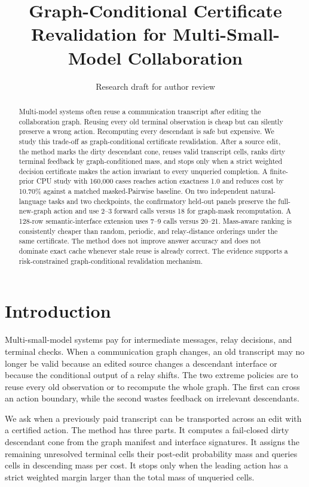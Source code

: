 \documentclass[11pt]{article}
\title{Graph-Conditional Certificate Revalidation for Multi-Small-Model Collaboration}
\author{Research draft for author review}
\begin{document}
\maketitle

\begin{abstract}
Multi-model systems often reuse a communication transcript after editing the collaboration graph. Reusing every old terminal observation is cheap but can silently preserve a wrong action. Recomputing every descendant is safe but expensive. We study this trade-off as graph-conditional certificate revalidation. After a source edit, the method marks the dirty descendant cone, reuses valid transcript cells, ranks dirty terminal feedback by graph-conditioned mass, and stops only when a strict weighted decision certificate makes the action invariant to every unqueried completion. A finite-prior CPU study with 160,000 cases reaches action exactness 1.0 and reduces cost by 10.70\% against a matched masked-Pairwise baseline. On two independent natural-language tasks and two checkpoints, the confirmatory held-out panels preserve the full-new-graph action and use 2--3 forward calls versus 18 for graph-mask recomputation. A 128-row semantic-interface extension uses 7--9 calls versus 20--21. Mass-aware ranking is consistently cheaper than random, periodic, and relay-distance orderings under the same certificate. The method does not improve answer accuracy and does not dominate exact cache whenever stale reuse is already correct. The evidence supports a risk-constrained graph-conditional revalidation mechanism.
\end{abstract}

\section{Introduction}
Multi-small-model systems pay for intermediate messages, relay decisions, and terminal checks. When a communication graph changes, an old transcript may no longer be valid because an edited source changes a descendant interface or because the conditional output of a relay shifts. The two extreme policies are to reuse every old observation or to recompute the whole graph. The first can cross an action boundary, while the second wastes feedback on irrelevant descendants.

We ask when a previously paid transcript can be transported across an edit with a certified action. The method has three parts. It computes a fail-closed dirty descendant cone from the graph manifest and interface signatures. It assigns the remaining unresolved terminal cells their post-edit probability mass and queries cells in descending mass per cost. It stops only when the leading action has a strict weighted margin larger than the total mass of unqueried cells.
\end{document}
